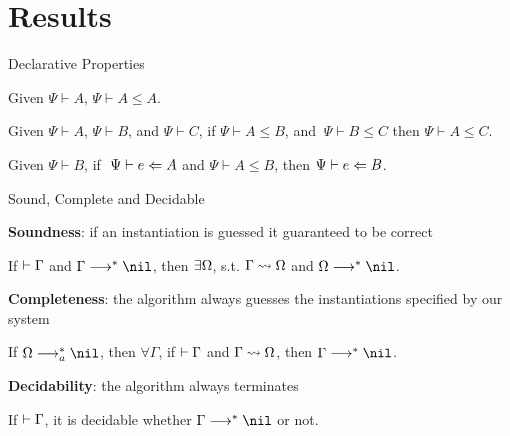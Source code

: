 \documentclass[aspectratio=169,10pt]{beamer}
\begin{document}
\section{Results}

\begin{frame}[fragile]{Declarative Properties}
\begin{theorem}\label{thm:sub_refl}
    Given $\Psi\vdash A$, $\Psi \vdash A \le A$.
\end{theorem}

\begin{theorem}\label{thm:sub_trans} Given $\Psi\vdash A$, $\Psi\vdash B$, and $\Psi\vdash C$, if $\Psi \vdash A \le B$, and $\ \Psi \vdash B \le C$ then $\Psi \vdash A \le C$.
\end{theorem}

\begin{theorem}
Given $\Psi\vdash B$, if $\ \Psi \vdash e \Leftarrow A$ and $\Psi \vdash A \le B$, then $\Psi \vdash e \Leftarrow B$.
\end{theorem}
\end{frame}



\begin{frame}[fragile]{Sound, Complete and Decidable}

\textbf{Soundness}: if an instantiation is guessed it guaranteed to be correct
\begin{theorem}[Soundness]
If $\vdash\Gamma$ and $\Gm \redto \nil$,
then $\exists \Omega$, s.t. $\Gamma\rightsquigarrow\Omega$ and $\Om\redto\nil$.
\end{theorem}

\textbf{Completeness}: the algorithm always guesses the instantiations specified by our system
\begin{theorem}[Completeness]
If $\Om\redto_a\nil$, then $\forall \Gamma$, if $\vdash\Gamma$ and $\Gamma\rightsquigarrow\Omega$, then $\Gm \redto \nil$.
\label{thm:completeness}
\end{theorem}

\textbf{Decidability}: the algorithm always terminates
\begin{theorem}[Decidability]
If $\vdash\Gamma$, it is decidable whether $\Gm\redto\nil$ or not.
\end{theorem}
\end{frame}
\end{document}
